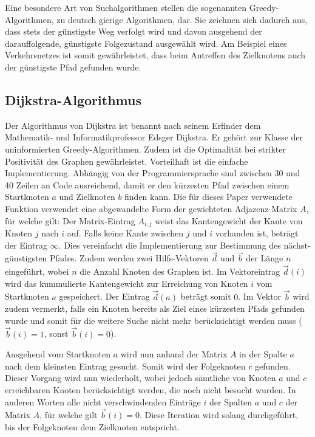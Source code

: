 Eine besondere Art von Suchalgorithmen stellen die sogenannten Greedy-Algorithmen, zu deutsch gierige Algorithmen, dar. Sie zeichnen sich dadurch aus, dass stets der günstigste Weg verfolgt wird und davon ausgehend der darauffolgende, günstigste Folgezustand ausgewählt wird. Am Beispiel eines Verkehrsnetzes ist somit gewährleistet, dass beim Antreffen des Zielknotens auch der günstigste Pfad gefunden wurde.

\subsection{Dijkstra-Algorithmus}
Der Algorithmus von Dijkstra ist benannt nach seinem Erfinder dem Mathematik- und Informatikprofessor Edsger Dijkstra. Er gehört zur Klasse der uninformierten Greedy-Algorithmen. Zudem ist die Optimalität bei strikter Positivität des Graphen gewährleistet.
Vorteilhaft ist die einfache Implementierung. Abhängig von der Programmiersprache sind zwischen 30 und 40 Zeilen an Code ausreichend, damit er den kürzesten Pfad zwischen einem Startknoten $a$ und Zielknoten $b$ finden kann. Die für dieses Paper verwendete Funktion verwendet eine abgewandelte Form der gewichteten Adjazenz-Matrix $A$, für welche gilt:
Der Matrix-Eintrag $A_{i,j}$ weist das Kantengewicht der Kante von Knoten $j$ nach $i$ auf. Falls keine Kante zwischen $j$ und $i$ vorhanden ist, beträgt der Eintrag $\infty$. Dies vereinfacht die Implementierung zur Bestimmung des nächst-günstigsten Pfades.
Zudem werden zwei Hilfs-Vektoren $\vec{d}$ und $\vec{b}$ der Länge $n$ eingeführt, wobei $n$ die Anzahl Knoten des Graphen ist. Im Vektoreintrag $\vec{d}(i)$ wird das kummulierte Kantengewicht zur Erreichung von Knoten $i$ vom Startknoten $a$ gespeichert. Der Eintrag $\vec{d}(a)$ beträgt somit $0$. Im Vektor $\vec{b}$ wird zudem vermerkt, falls ein Knoten bereits als Ziel eines kürzesten Pfads gefunden wurde und somit für die weitere Suche nicht mehr berücksichtigt werden muss ($\vec{b}(i)=1$, sonst $\vec{b}(i)=0$).

Ausgehend vom Startknoten $a$ wird nun anhand der Matrix $A$ in der Spalte $a$ nach dem kleinsten Eintrag gesucht. Somit wird der Folgeknoten $c$ gefunden. Dieser Vorgang wird nun wiederholt, wobei jedoch sämtliche von Knoten $a$ und $c$ erreichbaren Knoten berücksichtigt werden, die noch nicht besucht wurden. In anderen Worten alle nicht verschwindenden Einträge $i$ der Spalten $a$ und $c$ der Matrix $A$, für welche gilt $\vec{b}(i)=0$.
Diese Iteration wird solang durchgeführt, bis der Folgeknoten dem Zielknoten entspricht.

